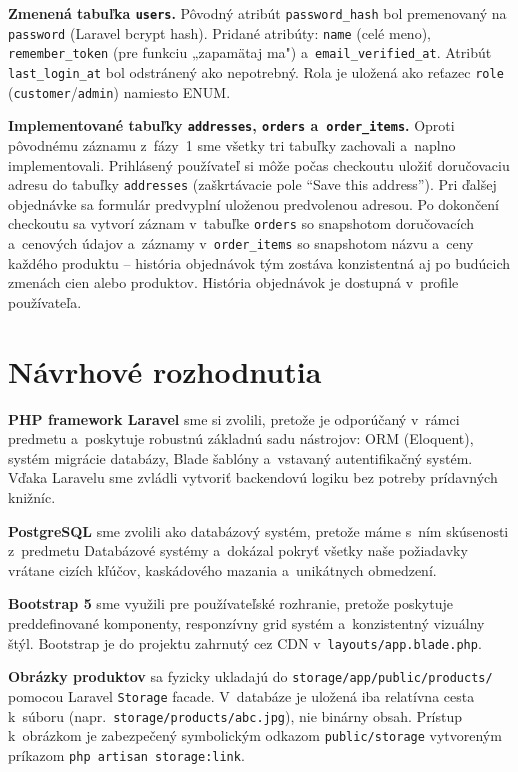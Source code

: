 \documentclass[12pt, a4paper]{article}
\begin{document}
\textbf{Zmenená tabuľka \texttt{users}.}
Pôvodný atribút \texttt{password\_hash} bol premenovaný na \texttt{password} (Laravel bcrypt hash). Pridané atribúty: \texttt{name} (celé meno), \texttt{remember\_token} (pre funkciu „zapamätaj ma") a~\texttt{email\_verified\_at}. Atribút \texttt{last\_login\_at} bol odstránený ako nepotrebný. Rola je uložená ako reťazec \texttt{role} (\texttt{customer}/\texttt{admin}) namiesto ENUM.

\textbf{Implementované tabuľky \texttt{addresses}, \texttt{orders} a~\texttt{order\_items}.}
Oproti pôvodnému záznamu z~fázy~1 sme všetky tri tabuľky zachovali a~naplno implementovali. Prihlásený používateľ si môže počas checkoutu uložiť doručovaciu adresu do tabuľky \texttt{addresses} (zaškrtávacie pole ``Save this address''). Pri ďalšej objednávke sa formulár predvyplní uloženou predvolenou adresou. Po dokončení checkoutu sa vytvorí záznam v~tabuľke \texttt{orders} so snapshotom doručovacích a~cenových údajov a~záznamy v~\texttt{order\_items} so snapshotom názvu a~ceny každého produktu -- história objednávok tým zostáva konzistentná aj po budúcich zmenách cien alebo produktov. História objednávok je dostupná v~profile používateľa.

\section{Návrhové rozhodnutia}

\textbf{PHP framework Laravel} sme si zvolili, pretože je odporúčaný v~rámci predmetu a~poskytuje robustnú základnú sadu nástrojov: ORM (Eloquent), systém migrácie databázy, Blade šablóny a~vstavaný autentifikačný systém. Vďaka Laravelu sme zvládli vytvoriť backendovú logiku bez potreby prídavných knižníc.

\textbf{PostgreSQL} sme zvolili ako databázový systém, pretože máme s~ním skúsenosti z~predmetu Databázové systémy a~dokázal pokryť všetky naše požiadavky vrátane cizích kľúčov, kaskádového mazania a~unikátnych obmedzení.

\textbf{Bootstrap 5} sme využili pre používateľské rozhranie, pretože poskytuje preddefinované komponenty, responzívny grid systém a~konzistentný vizuálny štýl. Bootstrap je do projektu zahrnutý cez CDN v~\texttt{layouts/app.blade.php}.

\textbf{Obrázky produktov} sa fyzicky ukladajú do \texttt{storage/app/public/products/} pomocou Laravel \texttt{Storage} facade. V~databáze je uložená iba relatívna cesta k~súboru (napr.\ \texttt{storage/products/abc.jpg}), nie binárny obsah. Prístup k~obrázkom je zabezpečený symbolickým odkazom \texttt{public/storage} vytvoreným príkazom \texttt{php artisan storage:link}.
\end{document}

